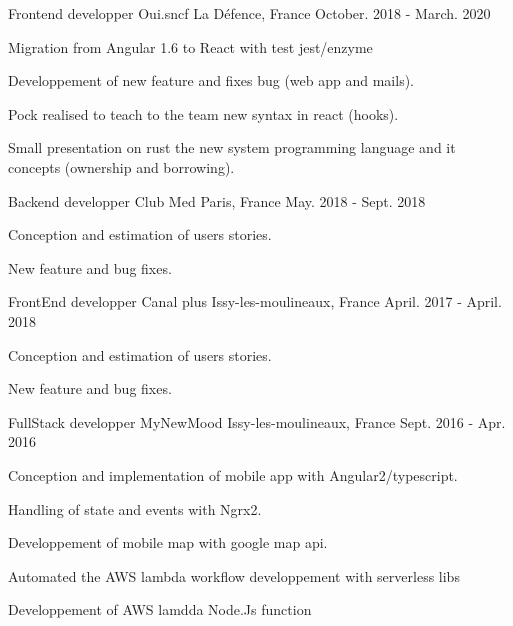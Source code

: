 \begin{cventries}
  \cventry
    {Frontend developper} %
    {Oui.sncf} %
    {La Défence, France} %
    {October. 2018 - March. 2020} %
    {
      \begin{cvitems} %
        \item {Migration from  Angular 1.6 to React with test jest/enzyme}
        \item {Developpement of new feature and fixes  bug (web app and mails).}
        \item {Pock realised to teach to the team new syntax in react (hooks).}
        \item {Small presentation on rust the new system programming language and it concepts (ownership and borrowing).}
      \end{cvitems}
    }
\cventry
  {Backend developper} %
  {Club Med} %
  {Paris, France} %
  {May. 2018 - Sept. 2018} %
  {
    \begin{cvitems} %
      \item {Conception and estimation of users stories.}
      \item {New feature and bug fixes.}
    \end{cvitems}
  }

  \cventry
    {FrontEnd developper} %
    {Canal plus} %
    {Issy-les-moulineaux, France} %
    {April. 2017 - April. 2018} %
    {
      \begin{cvitems} %
        \item {Conception and estimation of users stories.}
        \item {New feature and bug fixes.}
      \end{cvitems}
    }

  \cventry
    {FullStack developper} %
    {MyNewMood} %
    {Issy-les-moulineaux, France} %
    {Sept. 2016 - Apr. 2016} %
    {
      \begin{cvitems} %
        \item {Conception and implementation of mobile app  with Angular2/typescript.}
        \item {Handling of state and events with Ngrx2.}
        \item {Developpement of mobile map with google map api.}
        \item {Automated the AWS lambda workflow developpement with serverless libs}
        \item {Developpement of AWS lamdda Node.Js function}
      \end{cvitems}
    }


\end{cventries}
